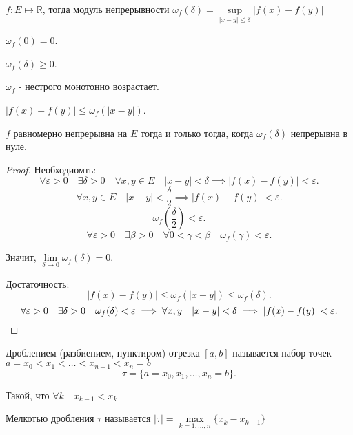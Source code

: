 \begin{definition} \thmslashn

    $f: E \mapsto \mathbb{R}$, тогда модуль непрерывности $\omega_{f}(\delta) = \sup\limits_{|x-y| \le \delta} |f(x)-f(y)|$
\end{definition}
\begin{properties} \thmslashn

    $\omega_{f}(0) = 0$.

    $\omega_{f}(\delta) \ge  0$.

    $\omega_{f}$ - нестрого монотонно возрастает.
    
    $|f(x)-f(y)| \le \omega_{f}(|x-y|)$.

    $f$ равномерно непрерывна на $E$ тогда и только тогда, когда $\omega_f(\delta)$ непрерывна в нуле.
    \begin{proof} \thmslashn

        Необходиомть:
        \[ \forall{\varepsilon > 0}\quad \exists{\delta > 0}\quad \forall{x, y\in E}\quad |x-y| < \delta \implies |f(x) - f(y)| < \varepsilon .\]
        \[ \forall{x, y\in E}\quad |x-y| < \frac{\delta}{2} \implies |f(x)-f(y)|<\varepsilon .\]
        \[ \omega_{f}\left(\frac{\delta}{2}\right) < \varepsilon  .\]
        \[ \forall{\varepsilon > 0}\quad \exists{\beta > 0}\quad \forall{0 < \gamma < \beta}\quad \omega_{f}(\gamma) < \varepsilon .\]
        
        Значит, $\lim\limits_{\delta \to 0} \omega_f(\delta) = 0$.

        Достаточность:
        \[ |f(x)-f(y)| \le \omega_{f}(|x-y|) \le \omega_{f}(\delta).\]
        \[ \forall{\varepsilon > 0}\quad \exists{\delta > 0}\quad \omega_{f}(\delta) < \varepsilon \implies \forall{x,y}\quad |x-y| < \delta \implies |f(x)-f(y)| < \varepsilon .\qedhere\] 
    \end{proof}
\end{properties}
\begin{definition} \thmslashn

    Дроблением (разбиением, пунктиром) отрезка $\left[a, b\right]$ называется набор точек $a=x_0 < x_1 < \ldots < x_{n-1} < x_n = b$
    \[ \tau = \{a=x_0, x_1, \ldots, x_n=b\}  .\]

    Такой, что $\forall{k}\quad x_{k-1} < x_k$
\end{definition}
\begin{definition} \thmslashn

    Мелкотью дробления $\tau$ называется $|\tau| = \max\limits_{k=1, \ldots, n} \{x_{k} - x_{k-1}\} $
\end{definition}
